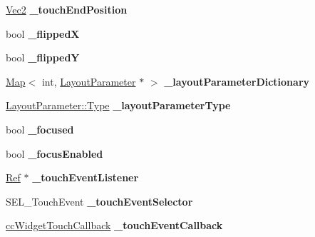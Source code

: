 \begin{DoxyCompactItemize}
\item 
\mbox{\label{classui_1_1Widget_aef1ca44581508b1ec95152c4b0be623e}} 
\hyperlink{classVec2}{Vec2} {\bfseries \+\_\+touch\+End\+Position}
\item 
\mbox{\label{classui_1_1Widget_a9e52ffb5f38b744cd212872c231aa3da}} 
bool {\bfseries \+\_\+flippedX}
\item 
\mbox{\label{classui_1_1Widget_a35c1627286e3d0cb2a8034ea0a5b016c}} 
bool {\bfseries \+\_\+flippedY}
\item 
\mbox{\label{classui_1_1Widget_a76e3d4779538db28e93cdc5d6dd98839}} 
\hyperlink{classMap}{Map}$<$ int, \hyperlink{classui_1_1LayoutParameter}{Layout\+Parameter} $\ast$ $>$ {\bfseries \+\_\+layout\+Parameter\+Dictionary}
\item 
\mbox{\label{classui_1_1Widget_a099fd10f0fe47b6b15b3f507c7f3a733}} 
\hyperlink{classui_1_1LayoutParameter_a1b01e01e7e6fc3de80f2e6d07fae806e}{Layout\+Parameter\+::\+Type} {\bfseries \+\_\+layout\+Parameter\+Type}
\item 
\mbox{\label{classui_1_1Widget_a21dbd6e3eb5fab088039b6390c10c444}} 
bool {\bfseries \+\_\+focused}
\item 
\mbox{\label{classui_1_1Widget_a6349f0f64c9edd4218292a28e5c89076}} 
bool {\bfseries \+\_\+focus\+Enabled}
\item 
\mbox{\label{classui_1_1Widget_a72dc9956b71bf17387f9ef24608a813e}} 
\hyperlink{classRef}{Ref} $\ast$ {\bfseries \+\_\+touch\+Event\+Listener}
\item 
\mbox{\label{classui_1_1Widget_a0b7a2c3a77c89b502d410c9b5998620c}} 
S\+E\+L\+\_\+\+Touch\+Event {\bfseries \+\_\+touch\+Event\+Selector}
\item 
\mbox{\label{classui_1_1Widget_a882409f7c21f1fce79f21b35de1a0d27}} 
\hyperlink{classui_1_1Widget_a4f2987649ba5a33d1edb8b13279b03c9}{cc\+Widget\+Touch\+Callback} {\bfseries \+\_\+touch\+Event\+Callback}
\item 

\end{DoxyCompactItemize}
